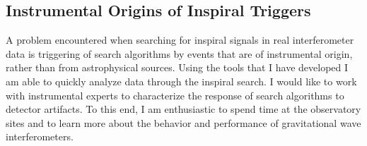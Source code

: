 \subsection{Instrumental Origins of Inspiral Triggers}

A problem encountered when searching for inspiral signals in real
interferometer data is triggering of search algorithms by events that are of
instrumental origin, rather than from astrophysical sources. Using the tools
that I have developed I am able to quickly analyze data through the inspiral
search. I would like to work with instrumental experts to characterize the
response of search algorithms to detector artifacts. To this end, I am
enthusiastic to spend time at the observatory sites and to learn more about
the behavior and performance of gravitational wave interferometers.

